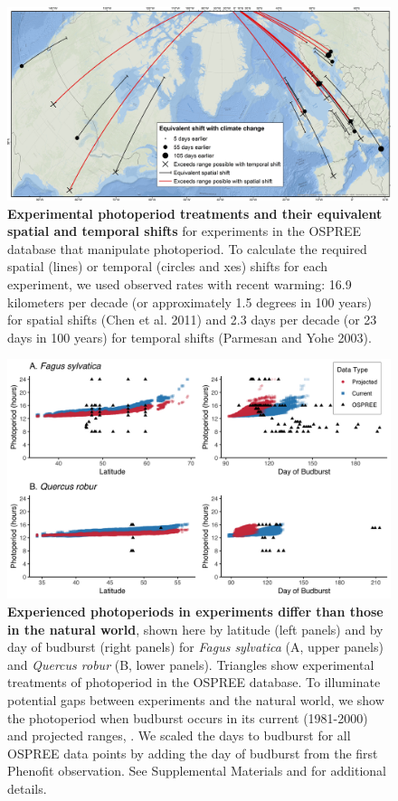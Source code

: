 \documentclass{article}
\begin{document}
\begin{figure}[p]
\centering
\includegraphics{..//..//analyses/photoperiod/figures/ospree_photopmap_fromblake.jpg} 
\caption{\textbf{Experimental photoperiod treatments and their equivalent spatial and temporal shifts} for experiments in the OSPREE database that manipulate photoperiod. To calculate the required spatial (lines) or temporal (circles and xes) shifts for each experiment, we used observed rates with recent warming: 16.9 kilometers per decade (or approximately 1.5 degrees in 100 years) for spatial shifts (Chen et al. 2011) and 2.3 days per decade (or 23 days in 100 years) for temporal shifts (Parmesan and Yohe 2003).}
 \label{fig:photomap}
 \end{figure}

 
\begin{figure}[p]
\includegraphics{..//..//analyses/photoperiod/figures/2D_actual_combined.png} 
\caption{\textbf{Experienced photoperiods in experiments differ than those in the natural world}, shown here by latitude (left panels) and by day of budburst (right panels) for \emph{Fagus sylvatica} (A, upper panels) and \emph{Quercus robur} (B, lower panels). Triangles show experimental treatments of photoperiod in the OSPREE database. To illuminate potential gaps between experiments and the natural world, we show the photoperiod when budburst occurs in its current (1981-2000) and projected ranges, \citep[2081-2100, using the A1Fi Phenofit scenario][]{duputie2015}. We scaled the days to budburst for all OSPREE data points by adding the day of budburst from the first Phenofit observation. See Supplemental Materials and \citet{duputie2015} for additional details.} 
 \label{fig:fagus}
 \end{figure}
 
\end{document}
